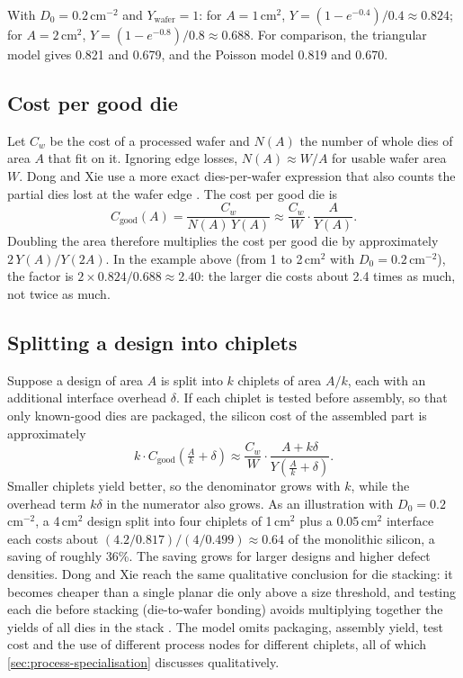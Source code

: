 With $D_0 = 0.2$\,cm$^{-2}$ and $Y_{\mathrm{wafer}} = 1$: for $A = 1$\,cm$^2$, $Y = (1-e^{-0.4})/0.4 \approx 0.824$; for $A = 2$\,cm$^2$, $Y = (1-e^{-0.8})/0.8 \approx 0.688$. For comparison, the triangular model gives 0.821 and 0.679, and the Poisson model 0.819 and 0.670.

\subsection{Cost per good die}
Let $C_w$ be the cost of a processed wafer and $N(A)$ the number of whole dies of area $A$ that fit on it. Ignoring edge losses, $N(A) \approx W/A$ for usable wafer area $W$. Dong and Xie use a more exact dies-per-wafer expression that also counts the partial dies lost at the wafer edge \cite{dongSystemlevelCostAnalysis2009}. The cost per good die is
\begin{equation*}
  C_{\text{good}}(A) = \frac{C_w}{N(A)\, Y(A)} \approx \frac{C_w}{W}\cdot\frac{A}{Y(A)}.
\end{equation*}
Doubling the area therefore multiplies the cost per good die by approximately $2\,Y(A)/Y(2A)$. In the example above (from 1 to 2\,cm$^2$ with $D_0=0.2$\,cm$^{-2}$), the factor is $2 \times 0.824/0.688 \approx 2.40$: the larger die costs about 2.4 times as much, not twice as much.

\subsection{Splitting a design into chiplets}
Suppose a design of area $A$ is split into $k$ chiplets of area $A/k$, each with an additional interface overhead $\delta$. If each chiplet is tested before assembly, so that only known-good dies are packaged, the silicon cost of the assembled part is approximately
\begin{equation*}
  k \cdot C_{\text{good}}\!\left(\tfrac{A}{k} + \delta\right) \approx \frac{C_w}{W}\cdot\frac{A + k\delta}{Y\!\left(\tfrac{A}{k} + \delta\right)}.
\end{equation*}
Smaller chiplets yield better, so the denominator grows with $k$, while the overhead term $k\delta$ in the numerator also grows. As an illustration with $D_0 = 0.2$\,cm$^{-2}$, a 4\,cm$^2$ design split into four chiplets of 1\,cm$^2$ plus a 0.05\,cm$^2$ interface each costs about $(4.2/0.817)/(4/0.499) \approx 0.64$ of the monolithic silicon, a saving of roughly 36\%. The saving grows for larger designs and higher defect densities. Dong and Xie reach the same qualitative conclusion for die stacking: it becomes cheaper than a single planar die only above a size threshold, and testing each die before stacking (die-to-wafer bonding) avoids multiplying together the yields of all dies in the stack \cite{dongSystemlevelCostAnalysis2009}. The model omits packaging, assembly yield, test cost and the use of different process nodes for different chiplets, all of which \cref{sec:process-specialisation} discusses qualitatively.
